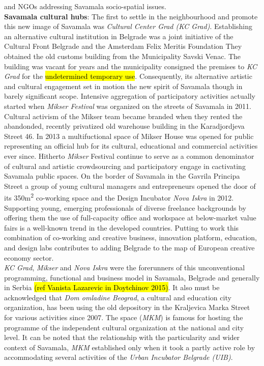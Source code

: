 \documentclass[11pt]{report}
\begin{document}
and
NGOs addressing Savamala socio-spatial issues.
\\
\textbf{Savamala cultural hubs}: 
The first to settle in the neighbourhood and promote this new image of Savamala was \textit{Cultural Center Grad (KC Grad)}. Establishing an alternative cultural institution in Belgrade was a joint initiative of the Cultural Front Belgrade and the Amsterdam Felix Meritis Foundation
They obtained the old customs building from the Municipality Savski Venac. The building was vacant for years and the municipality consigned the premises to \textit{KC Grad} for the \hl{undetermined temporary use}.
Consequently, its alternative artistic and cultural engagement set in motion the new spirit of Savamala though in barely significant scope.
Intensive aggregation of participatory activities actually started when \textit{Mikser Festival} was organized on the streets of Savamala in 2011. Cultural activism of the Mikser team became branded when they rented the abandonded, recently privatized old warehouse building in the Karadjordjeva Street 46. In 2013 a multifuctional space of Mikser House was opened for public representing an official hub for its cultural, educational and commercial activities ever since. Hitherto \textit{Mikser} Festival continue to serve as a common denominator of cultural and artistic crowdsourcing and participatory engage in cactivating Savamala public spaces.
On the border of Savamala in the Gavrila Principa Street a group of young cultural managers and entrepreneurs opened the door of its 350m\textsuperscript{2} co-working space and the Design Incubator \textit{Nova  Iskra} in 2012. Supporting young, emerging professionals of diverse freelance backgrounds by offering them the use of full-capacity office and workspace at below-market value fairs is a well-known trend in the developed countries. Putting to work this combination of co-working and creative business, innovation platform, education, and design labs contributes to adding Belgrade to the map of European creative economy sector. 
\\
\textit{KC Grad}, \textit{Mikser} and \textit{Nova Iskra} were the forerunners of this unconventional programming, functional and business model in Savamala, Belgrade and generally in Serbia \hl{(ref Vanista Lazarevic in Doytchinov 2015)}. 
It also must be acknowledged that \textit{Dom omladine Beograd}, a cultural and education city organization, has been using the old depository in the Kraljevica Marka Street for various activities since 2007. The space (\textit{MKM}) is famous for hosting the programme of the independent cultural organization at the national and city level. It can be noted that the relationship with the particularity and wider context of Savamala, \textit{MKM} established only when it took a partly active role by accommodating several activities of the \textit{Urban Incubator Belgrade (UIB)}.
\end{document}
